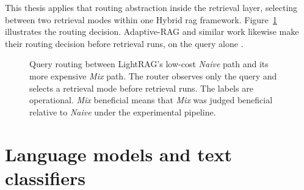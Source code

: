 \documentclass[english, bibtex]{kththesis}               %
\numberwithin{listing}{chapter}
\begin{document}
This thesis applies that routing abstraction inside the retrieval layer, selecting between two retrieval modes within one Hybrid \gls{rag} framework. Figure~\ref{fig:retrievalModeRouting} illustrates the routing decision. Adaptive-RAG and similar work likewise make their routing decision before retrieval runs, on the query alone \cite{jeong2024adaptiverag,hu2024routerbench}.

\begin{figure}[!ht]
\centering
{}
\caption{Query routing between LightRAG's low-cost \emph{Naive} path and its more expensive \emph{Mix} path. The router observes only the query and selects a retrieval mode before retrieval runs. The labels are operational. \emph{Mix} beneficial means that \emph{Mix} was judged beneficial relative to \emph{Naive} under the experimental pipeline.}
\label{fig:retrievalModeRouting}
\end{figure}

\section{Language models and text classifiers}
\label{sec:backgroundEncoderClassifiers}
\end{document}

